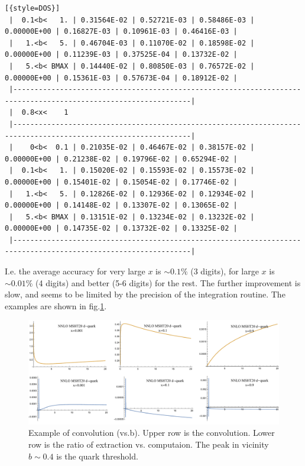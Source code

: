 \documentclass[prd,nofootinbib,eqsecnum,final]{revtex4}
\renewcommand{\(}{\left(}
\renewcommand{\)}{\right)}
\renewcommand{\[}{\left[}
\renewcommand{\]}{\right]}
\begin{document}
\begin{lstlisting}[{style=DOS}]
 |  0.1<b<   1. | 0.31564E-02 | 0.52721E-03 | 0.58486E-03 | 0.00000E+00 | 0.16827E-03 | 0.10961E-03 | 0.46416E-03 |
 |   1.<b<   5. | 0.46704E-03 | 0.11070E-02 | 0.18598E-02 | 0.00000E+00 | 0.11239E-03 | 0.37525E-04 | 0.13732E-02 |
 |   5.<b< BMAX | 0.14440E-02 | 0.80850E-03 | 0.76572E-02 | 0.00000E+00 | 0.15361E-03 | 0.57673E-04 | 0.18912E-02 |
 |----------------------------------------------------------------------------------------------------------------|
 |  0.8<x<    1
 |----------------------------------------------------------------------------------------------------------------|
 |    0<b<  0.1 | 0.21035E-02 | 0.46467E-02 | 0.38157E-02 | 0.00000E+00 | 0.21238E-02 | 0.19796E-02 | 0.65294E-02 |
 |  0.1<b<   1. | 0.15020E-02 | 0.15593E-02 | 0.15573E-02 | 0.00000E+00 | 0.15401E-02 | 0.15054E-02 | 0.17746E-02 |
 |   1.<b<   5. | 0.12826E-02 | 0.12936E-02 | 0.12934E-02 | 0.00000E+00 | 0.14148E-02 | 0.13307E-02 | 0.13065E-02 |
 |   5.<b< BMAX | 0.13151E-02 | 0.13234E-02 | 0.13232E-02 | 0.00000E+00 | 0.14735E-02 | 0.13732E-02 | 0.13325E-02 |
 |----------------------------------------------------------------------------------------------------------------|
\end{lstlisting}
I.e. the average accuracy for very large $x$ is $\sim 0.1\%$ (3 digits), for large $x$ is $\sim 0.01\%$ (4 digits) and better (5-6 digits) for the rest. The further improvement is slow, and seems to be limited by the precision of the integration routine. The examples are shown in fig.\ref{fig:OPE1}.

\begin{figure}
\begin{center}
\includegraphics[width=\textwidth]{Figures/uTMDPDF_OPE.pdf}
\caption{\label{fig:OPE1} Example of convolution (vs.b). Upper row is the convolution. Lower row is the ratio of extraction vs. computaion. The peak in vicinity $b\sim 0.4$ is the quark threshold.}
\end{center}
\end{figure}
\end{document}

